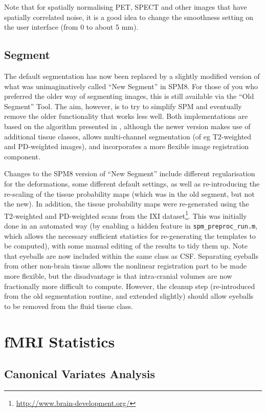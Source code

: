 \documentclass[a4paper,titlepage,openany]{article}
\begin{document}
\begin{multicols}{2}
Note that for spatially normalising PET, SPECT and other images that have spatially correlated noise, it is a good idea to change the smoothness setting on the user interface (from 0 to about 5 mm).

\subsection{Segment}
The default segmentation has now been replaced by a slightly modified version of what was unimaginatively called ``New Segment'' in SPM8.
For those of you who preferred the older way of segmenting images, this is still available via the ``Old Segment'' Tool.
The aim, however, is to try to simplify SPM and eventually remove the older functionality that works less well.
Both implementations are based on the algorithm presented in \cite{ashburner05}, although the newer version makes use of additional tissue classes, allows multi-channel segmentation (of eg T2-weighted and PD-weighted images), and incorporates a more flexible image registration component.

Changes to the SPM8 version of ``New Segment'' include different regularisation for the deformations, some different default settings, as well as re-introducing the re-scaling of the tissue probability maps (which was in the old segment, but not the new).  In addition, the tissue probability maps were re-generated using the T2-weighted and PD-weighted scans from the IXI dataset\footnote{\url{http://www.brain-development.org/}}.
This was initially done in an automated way (by enabling a hidden feature in \texttt{spm\_preproc\_run.m}, which allows the necessary sufficient statistics for re-generating the templates to be computed), with some manual editing of the results to tidy them up.
Note that eyeballs are now included within the same class as CSF.
Separating eyeballs from other non-brain tissue allows the nonlinear registration part to be made more flexible, but the disadvantage is that intra-cranial volumes are now fractionally more difficult to compute.
However, the cleanup step (re-introduced from the old segmentation routine, and extended slightly) should allow eyeballs to be removed from the fluid tissue class.

\section{fMRI Statistics}

\subsection{Canonical Variates Analysis}


\end{multicols}
\end{document}
